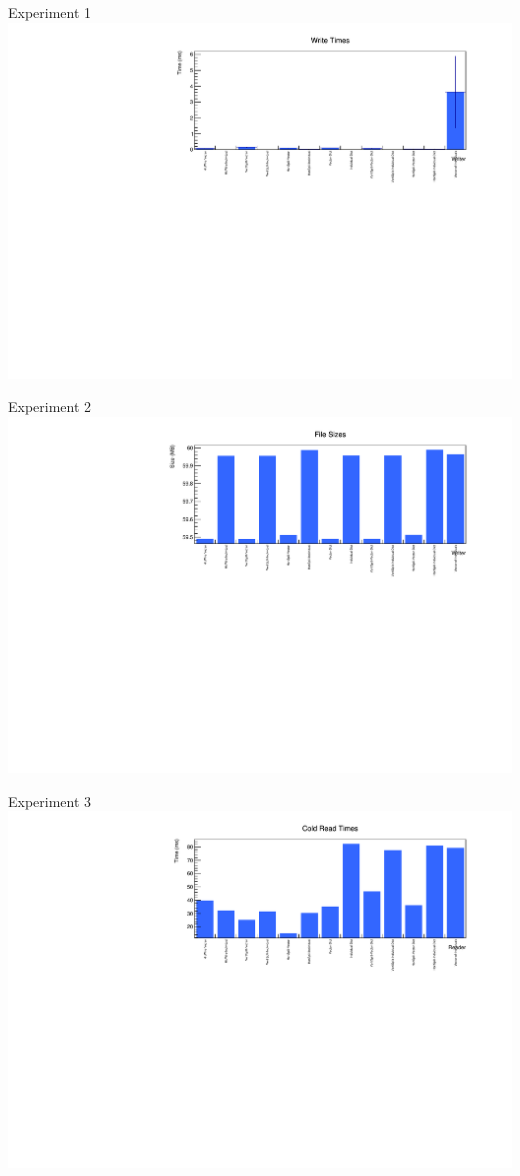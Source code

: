 \documentclass[aspectratio=169]{beamer}
\begin{document}
\begin{frame}{Experiment 1}
\centering
\includegraphics[width=0.9\linewidth]{../experiments/write_times.pdf}
\end{frame}

\begin{frame}{Experiment 2}
\centering
\includegraphics[width=0.9\linewidth]{../experiments/file_sizes.pdf}
\end{frame}

\begin{frame}{Experiment 3}
\centering
\includegraphics[width=0.9\linewidth]{../experiments/cold_times.pdf}
\end{frame}
\end{document}

